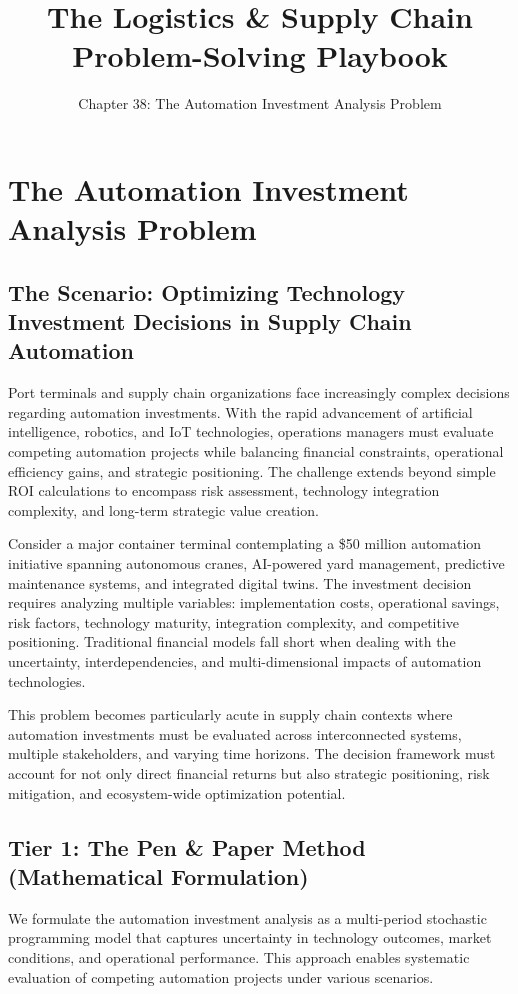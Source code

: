 \documentclass{article}
\title{The Logistics \& Supply Chain Problem-Solving Playbook}
\author{Chapter 38: The Automation Investment Analysis Problem}
\date{}
\begin{document}
\maketitle

\section{The Automation Investment Analysis Problem}

\subsection{The Scenario: Optimizing Technology Investment Decisions in Supply Chain Automation}

Port terminals and supply chain organizations face increasingly complex decisions regarding automation investments. With the rapid advancement of artificial intelligence, robotics, and IoT technologies, operations managers must evaluate competing automation projects while balancing financial constraints, operational efficiency gains, and strategic positioning. The challenge extends beyond simple ROI calculations to encompass risk assessment, technology integration complexity, and long-term strategic value creation.

Consider a major container terminal contemplating a \$50 million automation initiative spanning autonomous cranes, AI-powered yard management, predictive maintenance systems, and integrated digital twins. The investment decision requires analyzing multiple variables: implementation costs, operational savings, risk factors, technology maturity, integration complexity, and competitive positioning. Traditional financial models fall short when dealing with the uncertainty, interdependencies, and multi-dimensional impacts of automation technologies.

This problem becomes particularly acute in supply chain contexts where automation investments must be evaluated across interconnected systems, multiple stakeholders, and varying time horizons. The decision framework must account for not only direct financial returns but also strategic positioning, risk mitigation, and ecosystem-wide optimization potential.

\subsection{Tier 1: The Pen \& Paper Method (Mathematical Formulation)}

We formulate the automation investment analysis as a multi-period stochastic programming model that captures uncertainty in technology outcomes, market conditions, and operational performance. This approach enables systematic evaluation of competing automation projects under various scenarios.
\end{document}
